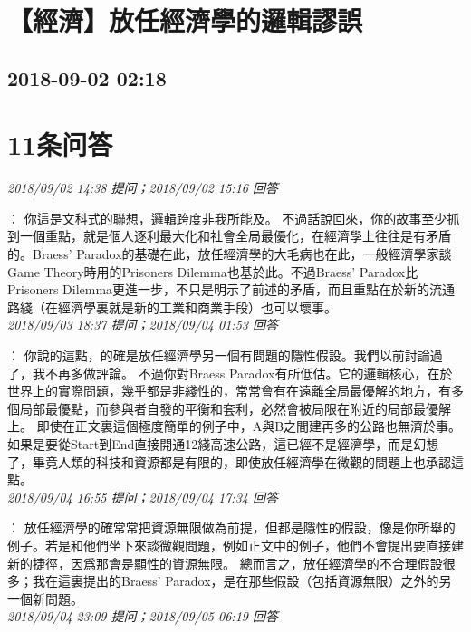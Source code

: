 \documentclass[twocolumn]{ctexart}
\begin{document}
\section{【經濟】放任經濟學的邏輯謬誤}
\subsection{2018-09-02 02:18}


\section{11条问答}

\textit{\hfill\noindent\small 2018/09/02 14:38 提问；2018/09/02 15:16 回答}

：
你這是文科式的聯想，邏輯跨度非我所能及。
不過話說回來，你的故事至少抓到一個重點，就是個人逐利最大化和社會全局最優化，在經濟學上往往是有矛盾的。Braess' Paradox的基礎在此，放任經濟學的大毛病也在此，一般經濟學家談Game Theory時用的Prisoners Dilemma也基於此。不過Braess' Paradox比Prisoners Dilemma更進一步，不只是明示了前述的矛盾，而且重點在於新的流通路綫（在經濟學裏就是新的工業和商業手段）也可以壞事。
\\

\textit{\hfill\noindent\small 2018/09/03 18:37 提问；2018/09/04 01:53 回答}

：
你說的這點，的確是放任經濟學另一個有問題的隱性假設。我們以前討論過了，我不再多做評論。
不過你對Braess Paradox有所低估。它的邏輯核心，在於世界上的實際問題，幾乎都是非綫性的，常常會有在遠離全局最優解的地方，有多個局部最優點，而參與者自發的平衡和套利，必然會被局限在附近的局部最優解上。
即使在正文裏這個極度簡單的例子中，A與B之間建再多的公路也無濟於事。如果是要從Start到End直接開通12綫高速公路，這已經不是經濟學，而是幻想了，畢竟人類的科技和資源都是有限的，即使放任經濟學在微觀的問題上也承認這點。
\\

\textit{\hfill\noindent\small 2018/09/04 16:55 提问；2018/09/04 17:34 回答}

：
放任經濟學的確常常把資源無限做為前提，但都是隱性的假設，像是你所舉的例子。若是和他們坐下來談微觀問題，例如正文中的例子，他們不會提出要直接建新的捷徑，因爲那會是顯性的資源無限。
總而言之，放任經濟學的不合理假設很多；我在這裏提出的Braess' Paradox，是在那些假設（包括資源無限）之外的另一個新問題。
\\

\textit{\hfill\noindent\small 2018/09/04 23:09 提问；2018/09/05 06:19 回答}
\end{document}

